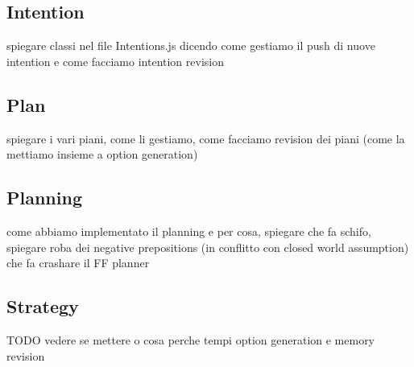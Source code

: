     \subsection{Intention}
        spiegare classi nel file Intentions.js dicendo come gestiamo il push di nuove intention e come facciamo intention revision

    \subsection{Plan}
        spiegare i vari piani, come li gestiamo, come facciamo revision dei piani (come la mettiamo insieme a option generation)

    \subsection{Planning}
        come abbiamo implementato il planning e per cosa, spiegare che fa schifo, spiegare roba dei negative prepositions (in conflitto con closed world assumption) che fa crashare il FF planner

    \subsection{Strategy}
        TODO vedere se mettere o cosa
        perche tempi option generation e memory revision

